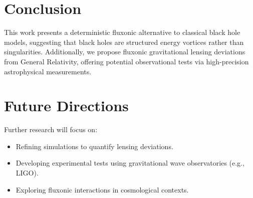 \documentclass{article}
\begin{document}
\section{Conclusion}
This work presents a deterministic fluxonic alternative to classical black hole models, suggesting that black holes are structured energy vortices rather than singularities. Additionally, we propose fluxonic gravitational lensing deviations from General Relativity, offering potential observational tests via high-precision astrophysical measurements.

\section{Future Directions}
Further research will focus on:
\begin{itemize}
    \item Refining simulations to quantify lensing deviations.
    \item Developing experimental tests using gravitational wave observatories (e.g., LIGO).
    \item Exploring fluxonic interactions in cosmological contexts.
\end{itemize}
\end{document}
